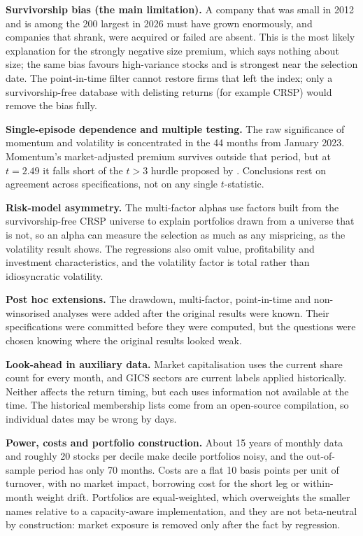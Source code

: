 \documentclass[11pt,a4paper]{article}
\begin{document}
\textbf{Survivorship bias (the main limitation).} A company that was small in 2012 and is among the 200 largest in 2026 must have grown enormously, and companies that shrank, were acquired or failed are absent. This is the most likely explanation for the strongly negative size premium, which says nothing about size; the same bias favours high-variance stocks and is strongest near the selection date. The point-in-time filter cannot restore firms that left the index; only a survivorship-free database with delisting returns (for example CRSP) would remove the bias fully.

\textbf{Single-episode dependence and multiple testing.} The raw significance of momentum and volatility is concentrated in the 44 months from January 2023. Momentum's market-adjusted premium survives outside that period, but at $t = 2.49$ it falls short of the $t > 3$ hurdle proposed by \citet{harvey2016}. Conclusions rest on agreement across specifications, not on any single $t$-statistic.

\textbf{Risk-model asymmetry.} The multi-factor alphas use factors built from the survivorship-free CRSP universe to explain portfolios drawn from a universe that is not, so an alpha can measure the selection as much as any mispricing, as the volatility result shows. The regressions also omit value, profitability and investment characteristics, and the volatility factor is total rather than idiosyncratic volatility.

\textbf{Post hoc extensions.} The drawdown, multi-factor, point-in-time and non-winsorised analyses were added after the original results were known. Their specifications were committed before they were computed, but the questions were chosen knowing where the original results looked weak.

\textbf{Look-ahead in auxiliary data.} Market capitalisation uses the current share count for every month, and GICS sectors are current labels applied historically. Neither affects the return timing, but each uses information not available at the time. The historical membership lists come from an open-source compilation, so individual dates may be wrong by days.

\textbf{Power, costs and portfolio construction.} About 15 years of monthly data and roughly 20 stocks per decile make decile portfolios noisy, and the out-of-sample period has only 70 months. Costs are a flat 10 basis points per unit of turnover, with no market impact, borrowing cost for the short leg or within-month weight drift. Portfolios are equal-weighted, which overweights the smaller names relative to a capacity-aware implementation, and they are not beta-neutral by construction: market exposure is removed only after the fact by regression.
\end{document}

